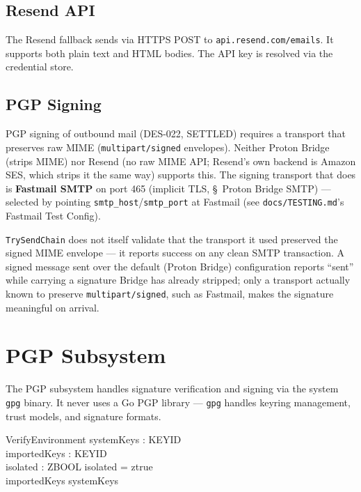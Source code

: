 \documentclass[a4paper,10pt,fleqn]{article}
\begin{document}
\subsection{Resend API}

The Resend fallback sends via HTTPS POST to
\texttt{api.resend.com/emails}.  It supports both plain text and
HTML bodies.  The API key is resolved via the credential store.

\subsection{PGP Signing}

PGP signing of outbound mail (DES-022, SETTLED) requires a transport
that preserves raw MIME (\texttt{multipart/signed} envelopes).
Neither Proton Bridge (strips MIME) nor Resend (no raw MIME API;
Resend's own backend is Amazon SES, which strips it the same way)
supports this.  The signing transport that does is \textbf{Fastmail
SMTP} on port 465 (implicit TLS, \S~Proton Bridge SMTP) --- selected
by pointing \texttt{smtp\_host}/\texttt{smtp\_port} at Fastmail (see
\texttt{docs/TESTING.md}'s Fastmail Test Config).

\texttt{TrySendChain} does not itself validate that the transport it
used preserved the signed MIME envelope --- it reports success on any
clean SMTP transaction.  A signed message sent over the default
(Proton Bridge) configuration reports ``sent'' while carrying a
signature Bridge has already stripped; only a transport actually known
to preserve \texttt{multipart/signed}, such as Fastmail, makes the
signature meaningful on arrival.

\section{PGP Subsystem}

The PGP subsystem handles signature verification and signing via
the system \texttt{gpg} binary.  It never uses a Go PGP library ---
\texttt{gpg} handles keyring management, trust models, and
signature formats.

\begin{schema}{VerifyEnvironment}
  systemKeys : \power KEYID \\
  importedKeys : \power KEYID \\
  isolated : ZBOOL
  \where
  isolated = ztrue \\
  importedKeys \subseteq systemKeys
\end{schema}
\end{document}
